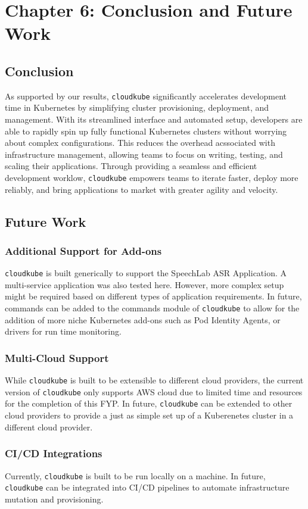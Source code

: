 \chapter{Chapter 6: Conclusion and Future Work}
\section{Conclusion}
As supported by our results, \texttt{cloudkube} significantly accelerates development time in Kubernetes by simplifying cluster provisioning, deployment,
and management. With its streamlined interface and automated setup, developers are able to rapidly spin up fully functional Kubernetes clusters without worrying
about complex configurations. This reduces the overhead acssociated with infrastructure management, allowing teams to focus on writing, testing, and scaling their applications.
Through providing a seamless and efficient development worklow, \texttt{cloudkube} empowers teams to iterate faster, deploy more reliably, and bring applications to market with greater agility and velocity. 


\section{Future Work}
\subsection{Additional Support for Add-ons}
\texttt{cloudkube} is built generically to support the SpeechLab ASR Application. A multi-service application was also tested here. However, more complex setup might 
be required based on different types of application requirements. In future, commands can be added to the commands module of \texttt{cloudkube} to allow for the 
addition of more niche Kubernetes add-ons such as Pod Identity Agents, or drivers for run time monitoring. 

\subsection{Multi-Cloud Support}
While \texttt{cloudkube} is built to be extensible to different cloud providers, the current version of \texttt{cloudkube} only supports AWS cloud due to limited
time and resources for the completion of this FYP. In future, \texttt{cloudkube} can be extended to other cloud providers to provide a just as simple set up of a Kuberenetes cluster
in a different cloud provider.

\subsection{CI/CD Integrations}
Currently, \texttt{cloudkube} is built to be run locally on a machine. In future, \texttt{cloudkube} can be integrated into CI/CD pipelines to automate infrastructure
mutation and provisioning. 

